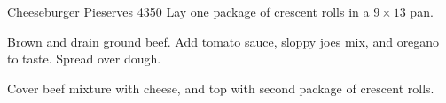 
\begin{recipe}{Cheeseburger Pie}{serves 4}{350\0}
    Lay one package of crescent rolls in a $9 \times 13$ pan.

    Brown and drain ground beef. Add tomato sauce, sloppy joes mix, and oregano to taste. Spread over dough.

    Cover beef mixture with cheese, and top with second package of crescent rolls.

\end{recipe}
